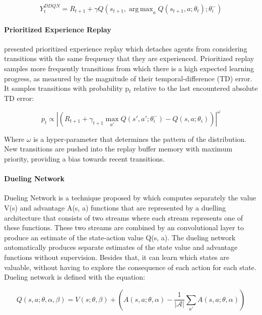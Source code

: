 \documentclass{llncs}
\DeclareMathOperator*{\argmax}{arg\,max}
\begin{document}
\begin{equation}
Y_{t}^{DDQN} = R_{t+1} + \gamma Q(s_{t+1}, \argmax_{a} Q(s_{t+1}, a;\theta_{t});\theta_{i}^{-})
\end{equation}

\paragraph{\textbf{Prioritized Experience Replay}}

\cite{SchaulQAS15} presented prioritized experience replay which detaches agents from considering transitions with the same frequency that they are experienced. Prioritized replay samples more frequently transitions from which there is a high expected learning progress, as measured by the magnitude of their temporal-difference (TD) error. It samples transitions with probability p$_{t}$ relative to the last encountered absolute TD error:
	
\begin{equation}
p_{t} \propto \left|\left(R_{t+1} + \gamma_{t+1} \max_{a'}Q\left(s',a';\theta_{i}^{-}\right) - Q\left(s,a;\theta_{i}\right)\right)\right|^{\omega}
\end{equation}

Where $\omega$ is a hyper-parameter that determines the pattern of the distribution. New transitions are pushed into the replay buffer memory with maximum priority, providing a bias towards recent transitions.

\paragraph{\textbf{Dueling Network}}\label{duelingNet}

Dueling Network is a technique proposed by \cite{Wang2016} which computes separately the value V(s) and advantage A(s, a) functions that are represented by a duelling architecture that consists of two streams where each stream represents one of these functions. These two streams are combined by an convolutional layer to produce an estimate of the state-action value Q(s, a). The dueling network automatically produces separate estimates of the state value and advantage functions without supervision. Besides that, it can learn which states are valuable, without having to explore the consequence of each action for each state. Dueling network is defined with the equation:

\begin{equation} \label{eq:dueling eq}
Q(s,a;\theta,\alpha,\beta) = V(s;\theta,\beta) + \left( A\left(s,a;\theta,\alpha \right) - \frac{1}{|\mathcal{A}|} \displaystyle\sum_{a'} A\left(s,a;\theta,\alpha \right) \right) 
\end{equation}
\end{document}
